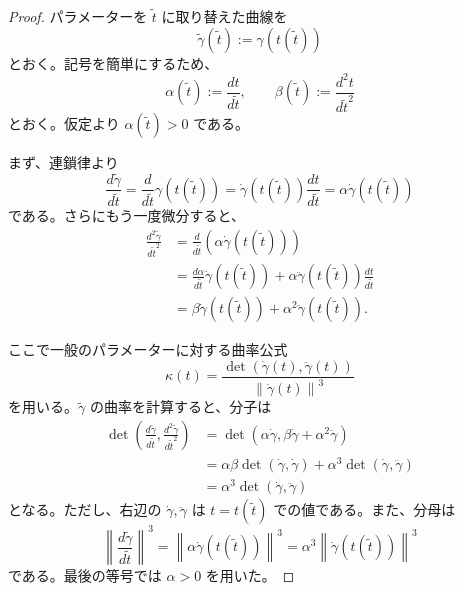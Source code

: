\documentclass[article,paper=a4paper]{jlreq}
\begin{document}
\begin{proof}
    パラメーターを $\tilde{t}$ に取り替えた曲線を
    \[
        \tilde{\gamma}(\tilde{t})
        :=
        \gamma(t(\tilde{t}))
    \]
    とおく。記号を簡単にするため、
    \[
        \alpha(\tilde{t}) := \frac{dt}{d\tilde{t}}, \qquad
        \beta(\tilde{t}) := \frac{d^2t}{d\tilde{t}^2}
    \]
    とおく。仮定より $\alpha(\tilde{t})>0$ である。

    まず、連鎖律より
    \[
        \frac{d\tilde{\gamma}}{d\tilde{t}}
        =
        \frac{d}{d\tilde{t}}\gamma(t(\tilde{t}))
        =
        \dot{\gamma}(t(\tilde{t}))\frac{dt}{d\tilde{t}}
        =
        \alpha\dot{\gamma}(t(\tilde{t}))
    \]
    である。さらにもう一度微分すると、
    \begin{align*}
        \frac{d^2\tilde{\gamma}}{d\tilde{t}^2}
        &=
        \frac{d}{d\tilde{t}}
        \left(\alpha\dot{\gamma}(t(\tilde{t}))\right)\\
        &=
        \frac{d\alpha}{d\tilde{t}}\dot{\gamma}(t(\tilde{t}))
        +
        \alpha\ddot{\gamma}(t(\tilde{t}))\frac{dt}{d\tilde{t}}\\
        &=
        \beta\dot{\gamma}(t(\tilde{t}))
        +
        \alpha^2\ddot{\gamma}(t(\tilde{t})).
    \end{align*}

    ここで一般のパラメーターに対する曲率公式
    \[
        \kappa(t)
        =
        \frac{\det(\dot{\gamma}(t),\ddot{\gamma}(t))}
        {\left\|\dot{\gamma}(t)\right\|^3}
    \]
    を用いる。$\tilde{\gamma}$ の曲率を計算すると、分子は
    \begin{align*}
        \det\left(
            \frac{d\tilde{\gamma}}{d\tilde{t}},
            \frac{d^2\tilde{\gamma}}{d\tilde{t}^2}
        \right)
        &=
        \det\left(
            \alpha\dot{\gamma},
            \beta\dot{\gamma}+\alpha^2\ddot{\gamma}
        \right)\\
        &=
        \alpha\beta\det(\dot{\gamma},\dot{\gamma})
        +
        \alpha^3\det(\dot{\gamma},\ddot{\gamma})\\
        &=
        \alpha^3\det(\dot{\gamma},\ddot{\gamma})
    \end{align*}
    となる。ただし、右辺の $\dot{\gamma},\ddot{\gamma}$ は $t=t(\tilde{t})$ での値である。また、分母は
    \[
        \left\|
            \frac{d\tilde{\gamma}}{d\tilde{t}}
        \right\|^3
        =
        \left\|\alpha\dot{\gamma}(t(\tilde{t}))\right\|^3
        =
        \alpha^3
        \left\|\dot{\gamma}(t(\tilde{t}))\right\|^3
    \]
    である。最後の等号では $\alpha>0$ を用いた。


\end{proof}
\end{document}
